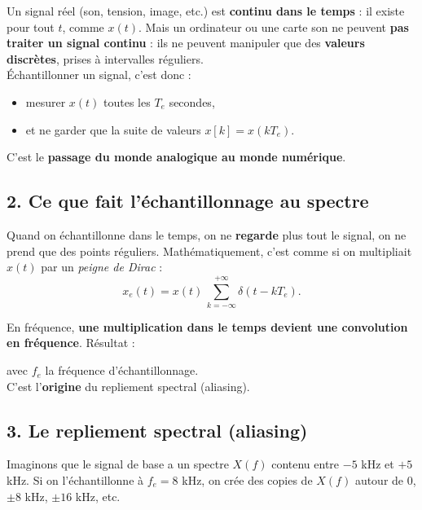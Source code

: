 Un signal réel (son, tension, image, etc.) est \textbf{continu dans le temps} : il existe pour tout $t$, comme $x(t)$. Mais un ordinateur ou une carte son ne peuvent \textbf{pas traiter un signal continu} : ils ne peuvent manipuler que des \textbf{valeurs discrètes}, prises à intervalles réguliers. \\

Échantillonner un signal, c'est donc :
\begin{itemize}
    \item mesurer $x(t)$ toutes les $T_e$ secondes,
    \item et ne garder que la suite de valeurs $x[k] = x(kT_e)$.
\end{itemize}

C'est le \textbf{passage du monde analogique au monde numérique}. \\

\subsection*{2. Ce que fait l'échantillonnage au spectre}

Quand on échantillonne dans le temps, on ne \textbf{regarde} plus tout le signal, on ne prend que des points réguliers. Mathématiquement, c'est comme si on multipliait $x(t)$ par un \emph{peigne de Dirac} :
\[
x_e(t) = x(t)\, \sum_{k=-\infty}^{+\infty} \delta(t - kT_e).
\]

En fréquence, \textbf{une multiplication dans le temps devient une convolution en fréquence}.  
Résultat :

\begin{center}
\end{center}
avec $f_e$ la fréquence d’échantillonnage. \\

C'est l'\textbf{origine} du repliement spectral (aliasing). \\

\subsection*{3. Le repliement spectral (aliasing)}

Imaginons que le signal de base a un spectre $X(f)$ contenu entre $-5$ kHz et $+5$ kHz.  
Si on l'échantillonne à $f_e = 8$ kHz, on crée des copies de $X(f)$ autour de $0$, $\pm 8$ kHz, $\pm 16$ kHz, etc. \\

